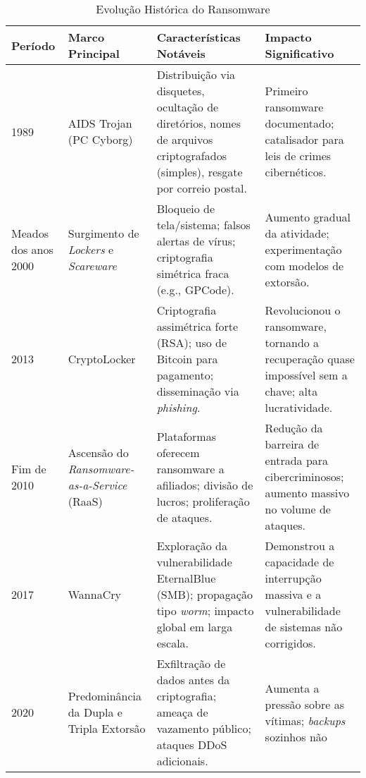 
\begin{table}[htbp]
    \centering
    \small
    \caption{Evolução Histórica do Ransomware}
    \label{tab:evolucao_historica}
    \sloppy
    \begin{tabularx}{\textwidth}{|l|p{3cm}|p{5cm}|p{5cm}|}
        \hline
        \textbf{Período} & \textbf{Marco Principal} & \textbf{Características Notáveis} & \textbf{Impacto Significativo} \\ \hline
        1989 & AIDS Trojan (PC Cyborg) & Distribuição via disquetes, ocultação de diretórios, nomes de arquivos criptografados 
        (simples), resgate por correio postal. & Primeiro ransomware documentado; catalisador para leis de crimes cibernéticos. 
        \cite{CyberMaxxRansomwareHistory, Muniandy2024Ransomware, WatchGuardAIDSTrojan} \\ \hline
        Meados dos anos 2000 & Surgimento de \textit{Lockers} e \textit{Scareware} & Bloqueio de tela/sistema; falsos alertas de vírus; 
        criptografia simétrica fraca (e.g., GPCode). & Aumento gradual da atividade; experimentação com modelos de extorsão. 
        \cite{Tanni2022RedAlert, MasterDCRansomwareHowItWorks, Robb2024RansomwareHistory} \\ \hline
        2013 & CryptoLocker & Criptografia assimétrica forte (RSA); uso de Bitcoin para pagamento; disseminação via 
        \textit{phishing}. & Revolucionou o ransomware, tornando a recuperação quase impossível sem a chave; alta lucratividade. 
        \cite{CyberMaxxRansomwareHistory, Muniandy2024Ransomware, Robb2024RansomwareHistory} \\ \hline
        Fim de 2010 & Ascensão do \textit{Ransomware-as-a-Service} (RaaS) & Plataformas oferecem ransomware a afiliados; 
        divisão de lucros; proliferação de ataques. & Redução da barreira de entrada para cibercriminosos; aumento massivo no 
        volume de ataques. \cite{CyberMaxxRansomwareHistory, Robb2024RansomwareHistory} \\ \hline
        2017 & WannaCry & Exploração da vulnerabilidade EternalBlue (SMB); propagação tipo \textit{worm}; impacto global em 
        larga escala. & Demonstrou a capacidade de interrupção massiva e a vulnerabilidade de sistemas não corrigidos. 
        \cite{CyberMaxxRansomwareHistory, WikipediaWannaCry} \\ \hline
        2020 & Predominância da Dupla e Tripla Extorsão & Exfiltração de dados antes da criptografia; ameaça 
        de vazamento público; ataques DDoS adicionais. & Aumenta a pressão sobre as vítimas; \textit{backups} sozinhos não 

\end{tabularx}
\end{table}
